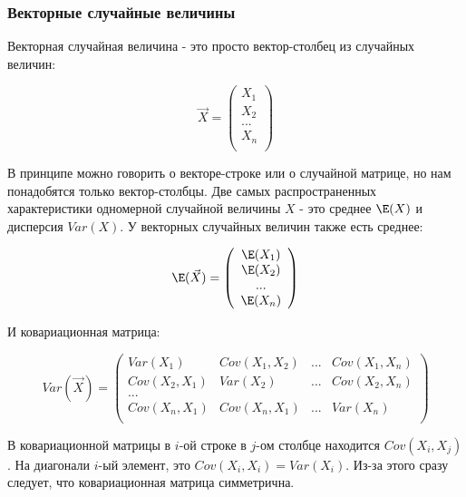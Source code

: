 \subsubsection*{Векторные случайные величины}

Векторная случайная величина - это просто вектор-столбец из случайных величин:

\begin{equation}
\vec{X}=\left(\begin{array}{c} X_{1} \\ X_{2} \\ ... \\ X_{n} \\  \end{array} \right)
\end{equation}

В принципе можно говорить о векторе-строке или о случайной матрице, но нам понадобятся только вектор-столбцы. Две самых распространенных характеристики одномерной случайной величины $X$ - это среднее $\E(X)$ и дисперсия $Var(X)$.
У векторных случайных величин также есть среднее:

\begin{equation}
\E(\vec{X})=\left(\begin{array}{c} \E(X_{1}) \\ \E(X_{2}) \\ ... \\ \E(X_{n}) \\  \end{array} \right)
\end{equation}



И ковариационная матрица:

\begin{equation}
Var(\vec{X})=\left(
\begin{array}{cccc} 
Var(X_{1}) & Cov(X_{1},X_{2}) & ... & Cov(X_{1},X_{n}) \\ 
Cov(X_{2},X_{1}) & Var(X_{2}) & ... & Cov(X_{2},X_{n}) \\ 
... &&&\\ 
Cov(X_{n},X_{1}) & Cov(X_{n},X_{1})  & ... & Var(X_{n})\\ 
\end{array} 
\right)
\end{equation}

В ковариационной матрицы в $i$-ой строке в $j$-ом столбце находится $Cov(X_{i},X_{j})$. На диагонали $i$-ый элемент, это $Cov(X_{i},X_{i})=Var(X_{i})$. Из-за этого сразу следует, что ковариационная матрица симметрична.

